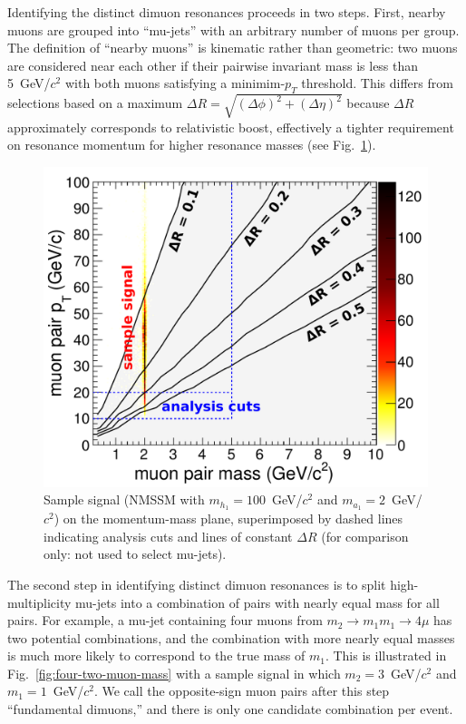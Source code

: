 \documentclass[12pt]{cms-tdr}
\begin{document}
Identifying the distinct dimuon resonances proceeds in two steps.
First, nearby muons are grouped into ``mu-jets'' with an arbitrary
number of muons per group.  The definition of ``nearby muons'' is
kinematic rather than geometric: two muons are considered near each
other if their pairwise invariant mass is less than 5~GeV/$c^2$ with
both muons satisfying a minimim-$p_T$ threshold.  This differs from
selections based on a maximum $\Delta R = \sqrt{(\Delta \phi)^2 +
  (\Delta \eta)^2}$ because $\Delta R$ approximately corresponds to
relativistic boost, effectively a tighter requirement on resonance
momentum for higher resonance masses (see
Fig.~\ref{fig:openingangle_dr}).

\begin{figure}
\begin{center}
\includegraphics[width=0.65\linewidth]{PLOTS/openingangle_with_signal.pdf}
\end{center}

\caption{Sample signal (NMSSM with $m_{h_1} = 100$~GeV/$c^2$ and $m_{a_1} =
  2$~GeV/$c^2$) on the momentum-mass plane, superimposed by dashed
  lines indicating analysis cuts and lines of constant $\Delta R$ (for
  comparison only: not used to select
  mu-jets). \label{fig:openingangle_dr}}
\end{figure}

The second step in identifying distinct dimuon resonances is to split
high-multiplicity mu-jets into a combination of pairs with nearly
equal mass for all pairs.  For example, a mu-jet containing four muons
from $m_2 \to m_1 m_1 \to 4\mu$ has two potential combinations, and
the combination with more nearly equal masses is much more likely to
correspond to the true mass of $m_1$.  This is illustrated in
Fig.~\ref{fig:four-two-muon-mass} with a sample signal in which $m_2 =
3$~GeV/$c^2$ and $m_1 = 1$~GeV/$c^2$.  We call the opposite-sign muon
pairs after this step ``fundamental dimuons,'' and there is only one
candidate combination per event.
\end{document}
